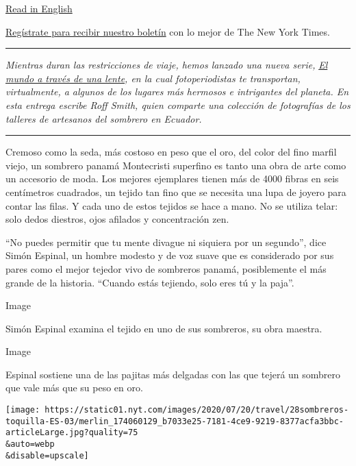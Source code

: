 \href{https://www.nytimes.com/2020/07/20/travel/panama-hats-ecuador.html}{Read
in English}

\href{https://www.nytimes.com/newsletters/el-times}{Regístrate para
recibir nuestro boletín} con lo mejor de The New York Times.

\begin{center}\rule{0.5\linewidth}{\linethickness}\end{center}

\emph{Mientras duran las restricciones de viaje, hemos lanzado una nueva
serie,}
\href{https://www.nytimes.com/column/the-world-through-a-lens}{\emph{El
mundo a través de una lente}}\emph{, en la cual fotoperiodistas te
transportan, virtualmente, a algunos de los lugares más hermosos e
intrigantes del planeta. En esta entrega escribe Roff Smith, quien
comparte una colección de fotografías de los talleres de artesanos del
sombrero en Ecuador.}

\begin{center}\rule{0.5\linewidth}{\linethickness}\end{center}

Cremoso como la seda, más costoso en peso que el oro, del color del fino
marfil viejo, un sombrero panamá Montecristi superfino es tanto una obra
de arte como un accesorio de moda. Los mejores ejemplares tienen más de
4000 fibras en seis centímetros cuadrados, un tejido tan fino que se
necesita una lupa de joyero para contar las filas. Y cada uno de estos
tejidos se hace a mano. No se utiliza telar: solo dedos diestros, ojos
afilados y concentración zen.

``No puedes permitir que tu mente divague ni siquiera por un segundo'',
dice Simón Espinal, un hombre modesto y de voz suave que es considerado
por sus pares como el mejor tejedor vivo de sombreros panamá,
posiblemente el más grande de la historia. ``Cuando estás tejiendo, solo
eres tú y la paja''.

Image

Simón Espinal examina el tejido en uno de sus sombreros, su obra
maestra.

Image

Espinal sostiene una de las pajitas más delgadas con las que tejerá un
sombrero que vale más que su peso en oro.

\texttt{[image: https://static01.nyt.com/images/2020/07/20/travel/28sombreros-toquilla-ES-03/merlin\_174060129\_b7033e25-7181-4ce9-9219-8377acfa3bbc-articleLarge.jpg?quality=75\\\&auto=webp\\\&disable=upscale]}

